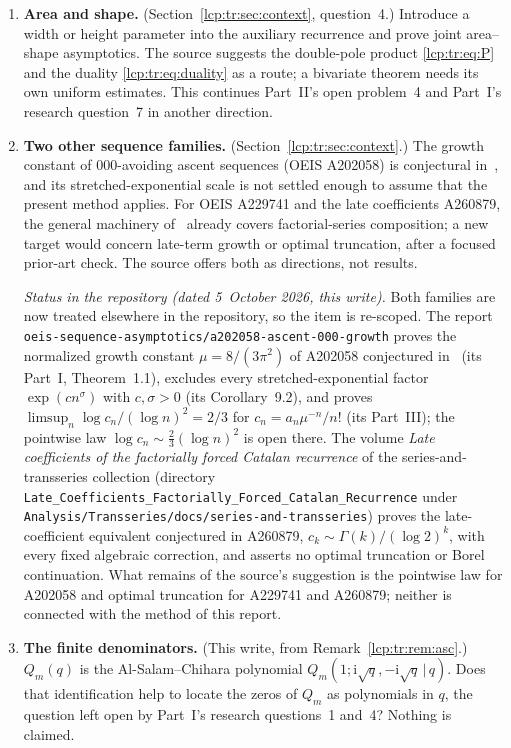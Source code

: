 \documentclass[11pt]{article}
\numberwithin{equation}{section}
\theoremstyle{definition}\newtheorem{definition}[theorem]{Definition}
\theoremstyle{remark}\newtheorem{remark}[theorem]{Remark}
\newcommand{\ii}{\mathrm i}%
\begin{document}
\begin{enumerate}[leftmargin=*,label=\textbf{\arabic*.},itemsep=0.5em]
 factorial growth, Borel singularities, optimal truncation. The tail bound
 \eqref{lcp:tr:eq:htail} and the alternating series \eqref{lcp:tr:eq:T}
 make the computation accessible; nothing is proved. This is Part~II's open
 problem~3.
\item \textbf{Area and shape.} (Section~\ref{lcp:tr:sec:context},
 question~4.) Introduce a width or height parameter into the auxiliary
 recurrence and prove joint area--shape asymptotics. The source suggests
 the double-pole product \eqref{lcp:tr:eq:P} and the duality
 \eqref{lcp:tr:eq:duality} as a route; a bivariate theorem needs its own
 uniform estimates. This continues Part~II's open problem~4 and Part~I's
 research question~7 in another direction.
\item \textbf{Two other sequence families.} (Section~\ref{lcp:tr:sec:context}.)
 The growth constant of $000$-avoiding ascent sequences (OEIS A202058) is
 conjectural in~\cite{lcp-tr-conway}, and its stretched-exponential scale is
 not settled enough to assume that the present method applies. For OEIS
 A229741 and the late coefficients A260879, the general machinery
 of~\cite{lcp-tr-borinsky} already covers factorial-series composition; a new
 target would concern late-term growth or optimal truncation, after a
 focused prior-art check. The source offers both as directions, not
 results.

 \emph{Status in the repository (dated 5~October 2026, this write).} Both
 families are now treated elsewhere in the repository, so the item is
 re-scoped. The report
 \nolinkurl{oeis-sequence-asymptotics/a202058-ascent-000-growth} proves the
 normalized growth constant $\mu=8/(3\pi^2)$ of A202058 conjectured
 in~\cite{lcp-tr-conway} (its Part~I, Theorem~1.1), excludes every
 stretched-exponential factor $\exp(cn^\sigma)$ with $c,\sigma>0$ (its
 Corollary~9.2), and proves $\limsup_n\log c_n/(\log n)^2=2/3$ for
 $c_n=a_n\mu^{-n}/n!$ (its Part~III); the pointwise law
 $\log c_n\sim\tfrac23(\log n)^2$ is open there. The volume \emph{Late coefficients of the factorially forced
 Catalan recurrence} of the series-and-transseries collection (directory
 \texttt{Late\_\allowbreak Coefficients\_\allowbreak Factorially\_\allowbreak Forced\_\allowbreak Catalan\_\allowbreak Recurrence}
 under \nolinkurl{Analysis/Transseries/docs/series-and-transseries})
 proves the late-coefficient equivalent conjectured in A260879,
 $c_k\sim\Gamma(k)/(\log2)^k$, with every fixed algebraic correction, and
 asserts no optimal truncation or Borel continuation. What remains of the
 source's suggestion is the pointwise law for A202058 and optimal
 truncation for A229741 and A260879; neither is connected with the method
 of this report.
\item \textbf{The finite denominators.} (This write, from
 Remark~\ref{lcp:tr:rem:asc}.) $Q_m(q)$ is the Al-Salam--Chihara polynomial
 $Q_m(1;\ii\sqrt q,-\ii\sqrt q\,|\,q)$. Does that identification help to
 locate the zeros of $Q_m$ as polynomials in $q$, the question left open by
 Part~I's research questions~1 and~4? Nothing is claimed.
\end{enumerate}
\end{document}
